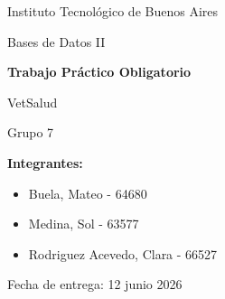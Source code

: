 \documentclass[10pt,a4paper]{article}
\newcommand{\universidad}{Instituto Tecnológico de Buenos Aires}
\newcommand{\materia}{Bases de Datos II}
\newcommand{\titulo}{Trabajo Práctico Obligatorio}
\newcommand{\subtitulo}{VetSalud}
\newcommand{\grupo}{Grupo 7}
\newcommand{\fechaEntrega}{12 junio 2026}
\begin{document}
\begin{titlepage}
    \centering

    \vspace*{1.5cm}

    {\Large \universidad \par}

    \vspace{2cm}

    {\Large \materia \par}

    \vspace{0.8cm}

    {\Huge \textbf{\titulo} \par}

    \vspace{0.6cm}

    {\Large \subtitulo \par}

    \vfill

    {\Large \grupo \par}

    \vspace{1cm}

    \begin{flushleft}
        \large
        \textbf{Integrantes:}
        \begin{itemize}
            \item Buela, Mateo - 64680
            \item Medina, Sol - 63577
            \item Rodriguez Acevedo, Clara - 66527
        \end{itemize}
    \end{flushleft}

    \vfill

    {\large Fecha de entrega: \fechaEntrega \par}

\end{titlepage}


\tableofcontents

\newpage

\setcounter{page}{1}
\end{document}
